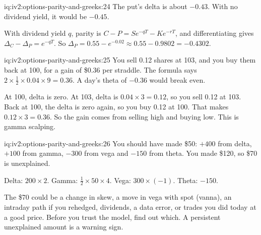 \begin{solution}{iq:iv2:options-parity-and-greeks:24}
The put's delta is about $-0.43$. With no dividend yield, it would be $-0.45$.

With dividend yield $q$, parity is $C - P = Se^{-qT} - Ke^{-rT}$, and differentiating gives $\Delta_C - \Delta_P = e^{-qT}$. So $\Delta_P = 0.55 - e^{-0.02} \approx 0.55 - 0.9802 = -0.4302$.

\end{solution}

\begin{solution}{iq:iv2:options-parity-and-greeks:25}
You sell 0.12 shares at 103, and you buy them back at 100, for a gain of \$0.36 per straddle. The formula says $2 \times \tfrac12 \times 0.04 \times 9 = 0.36$. A day's theta of $-0.36$ would break even.

At 100, delta is zero. At 103, delta is $0.04 \times 3 = 0.12$, so you sell 0.12 at 103. Back at 100, the delta is zero again, so you buy 0.12 at 100. That makes $0.12 \times 3 = 0.36$. So the gain comes from selling high and buying low. This is gamma scalping.

\end{solution}

\begin{solution}{iq:iv2:options-parity-and-greeks:26}
You should have made \$50: $+400$ from delta, $+100$ from gamma, $-300$ from vega and $-150$ from theta. You made \$120, so \$70 is unexplained.

Delta: $200 \times 2$. Gamma: $\tfrac12 \times 50 \times 4$. Vega: $300 \times (-1)$. Theta: $-150$.

The \$70 could be a change in skew, a move in vega with spot (vanna), an intraday path if you rehedged, dividends, a data error, or trades you did today at a good price. Before you trust the model, find out which. A persistent unexplained amount is a warning sign.

\end{solution}


